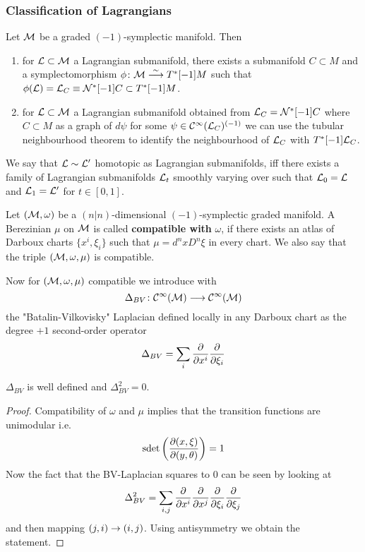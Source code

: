 \subsubsection{Classification of Lagrangians}

Let $\mathcal{M}$ be a graded $(-1)$-symplectic manifold. Then
\begin{enumerate}\label{Classfication_Lagrangian}
  \item for $\mathcal{L} \subset \mathcal{M}$ a Lagrangian submanifold, there exists a submanifold $C \subset M$ and a symplectomorphism $\phi \colon \MM \atob{\sim} T^*[-1]M$ such that $\phi(\LL) = \LL_C \equiv \NC^*[-1] C \subset T^*[-1]M$.

  \item for $\mathcal{L} \subset \mathcal{M}$ a Lagrangian submanifold obtained from $\mathcal{L}_C = \mathcal{N}^*[-1] C$ where $C \subset M$ as a graph of $d\psi$ for some $\psi \in \mathcal{C}^{\infty}(\mathcal{L}_C)^{(-1)}$ we can use the tubular neighbourhood theorem to identify the neighbourhood of $\mathcal{L}_C$ with $T^*[-1]\mathcal{L}_C$.
\end{enumerate}

We say that $\mathcal{L} \sim \mathcal{L}^\prime$ homotopic as Lagrangian submanifolds, iff there exists a family of Lagrangian submanifolds $\mathcal{L}_t$ smoothly varying over  such that $\mathcal{L}_0 = \mathcal{L}$ and $\mathcal{L}_1 = \mathcal{L}^\prime$ for $t \in [0,1]$.

\begin{definition}
  Let $(\mathcal{M}, \omega)$ be a $(n|n)$-dimensional $(-1)$-symplectic graded manifold. A Berezinian $\mu$ on $\mathcal{M}$ is called \textbf{compatible with} $\omega$, if there exists an atlas of Darboux charts $\{ x^i, \xi_i\}$ such that $\mu = d^nx D^n \xi$ in every chart. We also say that the triple $(\mathcal{M}, \omega, \mu)$ is compatible.
\end{definition}

Now for $(\mathcal{M}, \omega, \mu)$ compatible we introduce with
\begin{equation}
  \Delta_{BV} \colon \mathcal{C}^{\infty}(\mathcal{M}) \longrightarrow \mathcal{C}^{\infty}(\mathcal{M})
\end{equation}
the "Batalin-Vilkovisky" Laplacian defined locally in any Darboux chart as the degree $+1$ second-order operator
\begin{equation}
  \Delta_{BV} = \sum_i \frac{\partial }{\partial x^i} \frac{\partial }{\partial \xi_i}
\end{equation}

\begin{lem}
  $\Delta_{BV}$ is well defined and $\Delta_{BV}^2 = 0$.
\begin{proof}
  Compatibility of $\omega$ and $\mu$ implies that the transition functions are unimodular i.e.
  $$ \operatorname{sdet}\left( \frac{\partial (x, \xi)}{\partial (y, \theta)} \right) = 1 $$
  Now the fact that the BV-Laplacian squares to $0$ can be seen by looking at
  \begin{equation}
    \Delta_{BV}^2 = \sum_{i,j} \frac{\partial }{\partial x^i} \frac{\partial }{\partial x^j} \frac{\partial }{\partial \xi_i} \frac{\partial }{\partial \xi_j}
  \end{equation}
  and then mapping $(j,i) \rightarrow (i,j)$. Using antisymmetry we obtain the statement.
\end{proof}
\end{lem}

